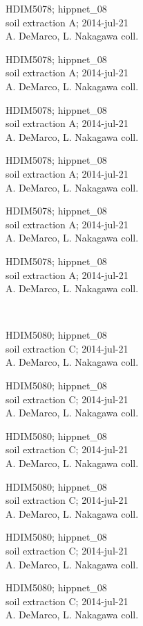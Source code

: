 \documentclass[2pt]{extarticle}
\begin{document}
\noindent
\parbox{0.16\textwidth}{\tiny \raggedright \rule[-0.3\baselineskip]{0pt}{10pt}HDIM5078; hippnet\_08\\ soil extraction A; 2014-jul-21\\ A. DeMarco, L. Nakagawa coll.}
\parbox{0.16\textwidth}{\tiny \raggedright \rule[-0.3\baselineskip]{0pt}{10pt}HDIM5078; hippnet\_08\\ soil extraction A; 2014-jul-21\\ A. DeMarco, L. Nakagawa coll.}
\parbox{0.16\textwidth}{\tiny \raggedright \rule[-0.3\baselineskip]{0pt}{10pt}HDIM5078; hippnet\_08\\ soil extraction A; 2014-jul-21\\ A. DeMarco, L. Nakagawa coll.}
\parbox{0.16\textwidth}{\tiny \raggedright \rule[-0.3\baselineskip]{0pt}{10pt}HDIM5078; hippnet\_08\\ soil extraction A; 2014-jul-21\\ A. DeMarco, L. Nakagawa coll.}
\parbox{0.16\textwidth}{\tiny \raggedright \rule[-0.3\baselineskip]{0pt}{10pt}HDIM5078; hippnet\_08\\ soil extraction A; 2014-jul-21\\ A. DeMarco, L. Nakagawa coll.}
\parbox{0.16\textwidth}{\tiny \raggedright \rule[-0.3\baselineskip]{0pt}{10pt}HDIM5078; hippnet\_08\\ soil extraction A; 2014-jul-21\\ A. DeMarco, L. Nakagawa coll.} \\ 
\vspace{0.001in} 

\noindent
\parbox{0.16\textwidth}{\tiny \raggedright \rule[-0.3\baselineskip]{0pt}{10pt}HDIM5080; hippnet\_08\\ soil extraction C; 2014-jul-21\\ A. DeMarco, L. Nakagawa coll.}
\parbox{0.16\textwidth}{\tiny \raggedright \rule[-0.3\baselineskip]{0pt}{10pt}HDIM5080; hippnet\_08\\ soil extraction C; 2014-jul-21\\ A. DeMarco, L. Nakagawa coll.}
\parbox{0.16\textwidth}{\tiny \raggedright \rule[-0.3\baselineskip]{0pt}{10pt}HDIM5080; hippnet\_08\\ soil extraction C; 2014-jul-21\\ A. DeMarco, L. Nakagawa coll.}
\parbox{0.16\textwidth}{\tiny \raggedright \rule[-0.3\baselineskip]{0pt}{10pt}HDIM5080; hippnet\_08\\ soil extraction C; 2014-jul-21\\ A. DeMarco, L. Nakagawa coll.}
\parbox{0.16\textwidth}{\tiny \raggedright \rule[-0.3\baselineskip]{0pt}{10pt}HDIM5080; hippnet\_08\\ soil extraction C; 2014-jul-21\\ A. DeMarco, L. Nakagawa coll.}
\parbox{0.16\textwidth}{\tiny \raggedright \rule[-0.3\baselineskip]{0pt}{10pt}HDIM5080; hippnet\_08\\ soil extraction C; 2014-jul-21\\ A. DeMarco, L. Nakagawa coll.} \\ 
\vspace{0.001in} 
\end{document}
